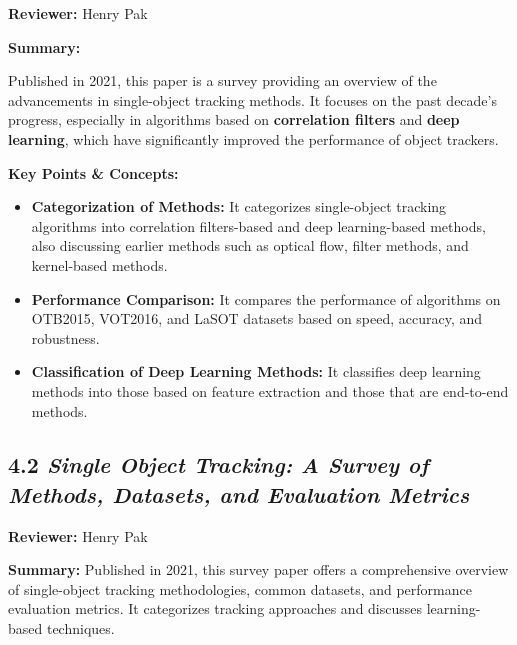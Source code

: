 \documentclass{article}
\begin{document}
\hspace*{\parindent}\textbf{Reviewer:} Henry Pak

\vspace{0.3cm}

\textbf{Summary:}

\vspace{0.3cm}

Published in 2021, this paper is a survey providing an overview of the advancements in single-object tracking methods. It focuses on the past decade's progress, especially in algorithms based on \textbf{correlation filters} and \textbf{deep learning}, which have significantly improved the performance of object trackers.

\vspace{0.3cm}

\textbf{Key Points \& Concepts:}
\begin{itemize}
  \item \textbf{Categorization of Methods:} It categorizes single-object tracking algorithms into correlation filters-based and deep learning-based methods, also discussing earlier methods such as optical flow, filter methods, and kernel-based methods.
  \item \textbf{Performance Comparison:} It compares the performance of algorithms on OTB2015, VOT2016, and LaSOT datasets based on speed, accuracy, and robustness.
  \item \textbf{Classification of Deep Learning Methods:} It classifies deep learning methods into those based on feature extraction and those that are end-to-end methods.
\end{itemize}

\subsection*{4.2 \textit{Single Object Tracking: A Survey of Methods, Datasets, and Evaluation Metrics}}

\hspace*{\parindent}\textbf{Reviewer:} Henry Pak

\vspace{0.3cm}

\textbf{Summary:} Published in 2021, this survey paper offers a comprehensive overview of single-object tracking methodologies, common datasets, and performance evaluation metrics. It categorizes tracking approaches and discusses learning-based techniques.
\end{document}
